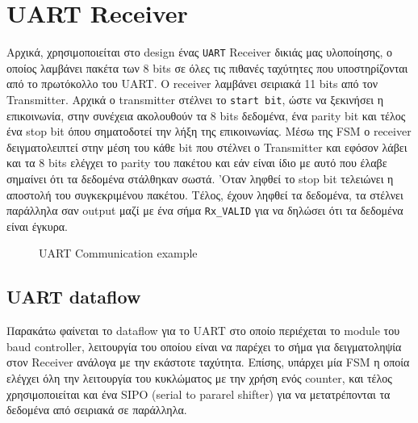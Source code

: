 \documentclass[12pt,a4paper]{article}
\begin{document}
    
	
	\section{\textcolor{PineGreen}{UART Receiver} }
    Αρχικά, χρησιμοποιείται στο design ένας \verb|UART| Receiver δικιάς μας υλοποίησης, ο οποίος λαμβάνει πακέτα των 8 bits σε όλες τις πιθανές ταχύτητες που υποστηρίζονται από το πρωτόκολλο του UART. O receiver λαμβάνει σειριακά 11 bits από τον Transmitter. Αρχικά ο transmitter στέλνει το \verb|start bit|, ώστε να ξεκινήσει η επικοινωνία, στην συνέχεια ακολουθούν τα 8 bits δεδομένα, ένα parity bit και τέλος ένα stop bit όπου σηματοδοτεί την λήξη της επικοινωνίας. Μέσω της FSM ο receiver δειγματολειπτεί στην μέση του κάθε bit που στέλνει ο Transmitter και εφόσον λάβει και τα 8 bits ελέγχει το parity του πακέτου και εάν είναι ίδιο με αυτό που έλαβε σημαίνει ότι τα δεδομένα στάλθηκαν σωστά. 'Οταν ληφθεί το stop bit τελειώνει η αποστολή του συγκεκριμένου πακέτου. Τέλος, έχουν ληφθεί τα δεδομένα, τα στέλνει παράλληλα σαν output μαζί με ένα σήμα \verb|Rx_VALID| για να δηλώσει ότι τα δεδομένα είναι έγκυρα.
    
     \begin{figure} [H]
     	\caption{UART Communication example}
     	\label{UART Communication example}
     \end{figure}

     
	\subsection{\textcolor{PineGreen}{UART dataflow}}
    Παρακάτω φαίνεται το dataflow για το UART στο οποίο περιέχεται το module του baud controller, λειτουργία του οποίου είναι να παρέχει το σήμα για δειγματοληψία στον Receiver ανάλογα με την εκάστοτε ταχύτητα. Επίσης, υπάρχει μία FSM η οποία ελέγχει όλη την λειτουργία του κυκλώματος με την χρήση ενός counter, και τέλος χρησιμοποιείται και ένα SIPO (serial to pararel shifter) για να μετατρέπονται τα δεδομένα από σειριακά σε παράλληλα.
    
\end{document}
